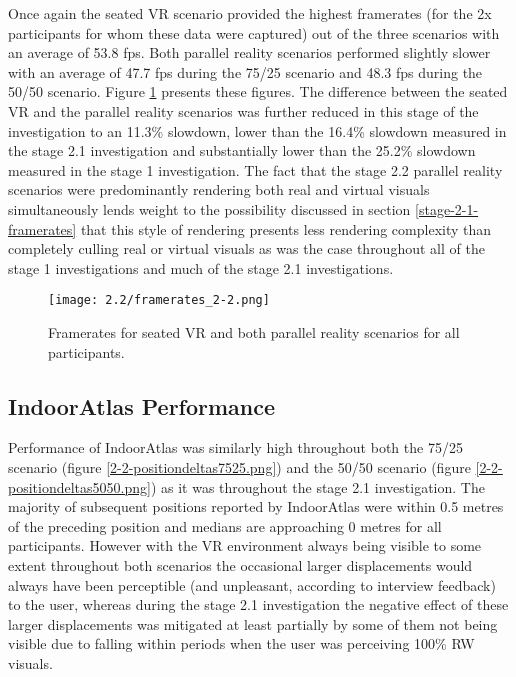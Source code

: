 Once again the seated VR scenario provided the highest framerates (for the 2x participants for whom these data were captured) out of the three scenarios with an average of 53.8 fps. Both parallel reality scenarios performed slightly slower with an average of 47.7 fps during the 75/25 scenario and 48.3 fps during the 50/50 scenario. Figure \ref{framerates_2-2.png} presents these figures. The difference between the seated VR and the parallel reality scenarios was further reduced in this stage of the investigation to an 11.3\% slowdown, lower than the 16.4\% slowdown measured in the stage 2.1 investigation and substantially lower than the 25.2\% slowdown measured in the stage 1 investigation. The fact that the stage 2.2 parallel reality scenarios were predominantly rendering both real and virtual visuals simultaneously lends weight to the possibility discussed in section \ref{stage-2-1-framerates} that this style of rendering presents less rendering complexity than completely culling real or virtual visuals as was the case throughout all of the stage 1 investigations and much of the stage 2.1 investigations.

\begin{figure}
	\begin{center}
	\texttt{[image: 2.2/framerates\_2-2.png]}
	\caption{Framerates for seated VR and both parallel reality scenarios for all participants.}
	\label{framerates_2-2.png}
	\end{center}
\end{figure}


\subsection{IndoorAtlas Performance}

Performance of IndoorAtlas was similarly high throughout both the 75/25 scenario (figure \ref{2-2-positiondeltas7525.png}) and the 50/50 scenario (figure \ref{2-2-positiondeltas5050.png}) as it was throughout the stage 2.1 investigation. The majority of subsequent positions reported by IndoorAtlas were within 0.5 metres of the preceding position and medians are approaching 0 metres for all participants. However with the VR environment always being visible to some extent throughout both scenarios the occasional larger displacements would always have been perceptible (and unpleasant, according to interview feedback) to the user, whereas during the stage 2.1 investigation the negative effect of these larger displacements was mitigated at least partially by some of them not being visible due to falling within periods when the user was perceiving 100\% RW visuals.

